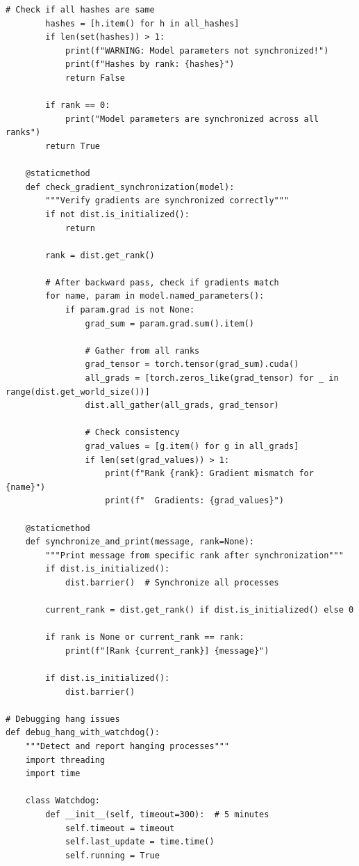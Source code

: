 \begin{lstlisting}[style=python, caption=Debugging utilities for distributed training]
        # Check if all hashes are same
        hashes = [h.item() for h in all_hashes]
        if len(set(hashes)) > 1:
            print(f"WARNING: Model parameters not synchronized!")
            print(f"Hashes by rank: {hashes}")
            return False

        if rank == 0:
            print("Model parameters are synchronized across all ranks")
        return True

    @staticmethod
    def check_gradient_synchronization(model):
        """Verify gradients are synchronized correctly"""
        if not dist.is_initialized():
            return

        rank = dist.get_rank()

        # After backward pass, check if gradients match
        for name, param in model.named_parameters():
            if param.grad is not None:
                grad_sum = param.grad.sum().item()

                # Gather from all ranks
                grad_tensor = torch.tensor(grad_sum).cuda()
                all_grads = [torch.zeros_like(grad_tensor) for _ in range(dist.get_world_size())]
                dist.all_gather(all_grads, grad_tensor)

                # Check consistency
                grad_values = [g.item() for g in all_grads]
                if len(set(grad_values)) > 1:
                    print(f"Rank {rank}: Gradient mismatch for {name}")
                    print(f"  Gradients: {grad_values}")

    @staticmethod
    def synchronize_and_print(message, rank=None):
        """Print message from specific rank after synchronization"""
        if dist.is_initialized():
            dist.barrier()  # Synchronize all processes

        current_rank = dist.get_rank() if dist.is_initialized() else 0

        if rank is None or current_rank == rank:
            print(f"[Rank {current_rank}] {message}")

        if dist.is_initialized():
            dist.barrier()

# Debugging hang issues
def debug_hang_with_watchdog():
    """Detect and report hanging processes"""
    import threading
    import time

    class Watchdog:
        def __init__(self, timeout=300):  # 5 minutes
            self.timeout = timeout
            self.last_update = time.time()
            self.running = True


\end{lstlisting}
